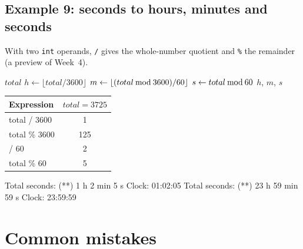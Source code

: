 \subsection{Example 9: seconds to hours, minutes and seconds}
With two \texttt{int} operands, \texttt{/} gives the whole-number quotient and \texttt{\%} the remainder (a preview of Week~4).
\begin{center}
\begin{minipage}[c]{0.5\linewidth}
\begin{pseudobox}
\begin{algorithmic}[1]
\START
\State \READ $total$
\State $h \gets \lfloor total / 3600 \rfloor$
\State $m \gets \lfloor (total \mathbin{\mathrm{mod}} 3600) / 60 \rfloor$
\State $s \gets total \mathbin{\mathrm{mod}} 60$
\State \PRINT $h$, $m$, $s$
\STOP
\end{algorithmic}
\end{pseudobox}
\end{minipage}\hfill
\begin{minipage}[c]{0.44\linewidth}\centering\small
\begin{tabular}{>{\ttfamily}lc}
\toprule
\normalfont Expression & $total=3725$\\ \midrule
total / 3600 & 1\\ total \% 3600 & 125\\ 125 / 60 & 2\\ total \% 60 & 5\\ \bottomrule
\end{tabular}
\end{minipage}
\end{center}

\begin{consolebox}
\begin{run}
Total seconds: (**)
1 h 2 min 5 s
Clock: 01:02:05
Total seconds: (**)
23 h 59 min 59 s
Clock: 23:59:59
\end{run}
\end{consolebox}

\section{Common mistakes}\label{sec:mistakes}

